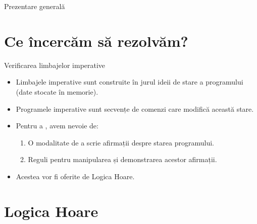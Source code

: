 
\begin{frame}{Prezentare generală}
\tableofcontents
\end{frame}

\section{Ce încercăm să rezolvăm?}

\begin{frame}{Verificarea limbajelor imperative}

\begin{itemize}
	\item Limbajele imperative sunt construite în jurul ideii de \alert{stare a programului} \\(date stocate în memorie).
	\medskip
	\item Programele imperative sunt secvențe de \alert{comenzi care modifică această stare}.
	\medskip \pause
	\item Pentru a , avem nevoie de:
	\begin{enumerate}
		\item O modalitate de a scrie afirmații despre starea programului.
		\item Reguli pentru manipularea și demonstrarea acestor afirmații.
	\end{enumerate}
	\medskip \pause
	\item Acestea vor fi oferite de \alert{Logica Hoare}.
\end{itemize}

\end{frame}

\section{Logica Hoare}

